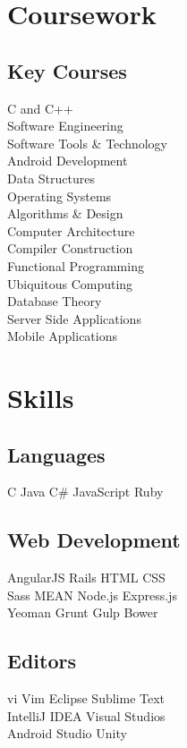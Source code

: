 \documentclass[]{deedy-resume-openfont}
\begin{document}
\begin{minipage}[t]{0.33\textwidth}
\section{Coursework}
\subsection{Key Courses}
C and C++ \\
Software Engineering \\
Software Tools \& Technology \\
Android Development \\
Data Structures \\
Operating Systems \\
Algorithms \& Design \\
Computer Architecture \\
Compiler Construction \\
Functional Programming \\
Ubiquitous Computing \\
Database Theory \\
Server Side Applications \\
Mobile Applications \\
\sectionsep


\section{Skills}
\subsection{Languages}
C \textbullet{} Java \textbullet{} C\# \textbullet{} JavaScript \textbullet{} Ruby \\ 
\subsection{Web Development}
AngularJS \textbullet{} Rails \textbullet{} HTML \textbullet{} CSS \\
Sass \textbullet{} MEAN \textbullet{}  Node.js \textbullet{} Express.js \\
Yeoman \textbullet{} Grunt \textbullet{} Gulp \textbullet{} Bower \\
\subsection{Editors}
vi \textbullet{} Vim \textbullet{} Eclipse \textbullet{} Sublime Text \\
IntelliJ IDEA \textbullet{} Visual Studios \\
Android Studio \textbullet{} Unity

\end{minipage}
\end{document}
